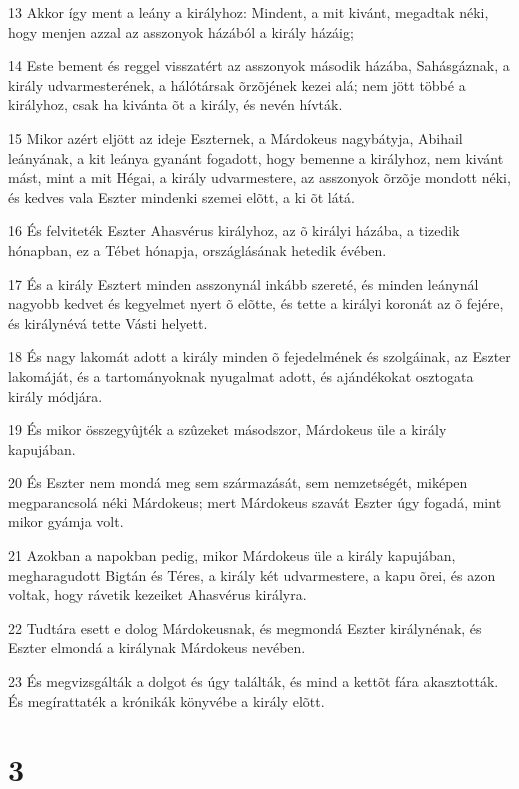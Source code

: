 \par 13 Akkor így ment a leány a királyhoz: Mindent, a mit kivánt, megadtak néki, hogy menjen azzal az asszonyok házából a király házáig;
\par 14 Este bement és reggel visszatért az asszonyok második házába, Sahásgáznak, a király udvarmesterének, a hálótársak õrzõjének kezei alá; nem jött többé a királyhoz, csak ha kivánta õt a király, és nevén hívták.
\par 15 Mikor azért eljött az ideje Eszternek, a Márdokeus nagybátyja, Abihail leányának, a kit leánya gyanánt fogadott, hogy bemenne a királyhoz, nem kivánt mást, mint a mit Hégai, a király udvarmestere, az asszonyok õrzõje mondott néki, és kedves vala Eszter mindenki szemei elõtt, a ki õt látá.
\par 16 És felviteték Eszter Ahasvérus királyhoz, az õ királyi házába, a tizedik hónapban, ez a Tébet hónapja, országlásának hetedik évében.
\par 17 És a király Esztert minden asszonynál inkább szereté, és minden leánynál nagyobb kedvet és kegyelmet nyert õ elõtte, és tette a királyi koronát az õ fejére, és királynévá tette Vásti helyett.
\par 18 És nagy lakomát adott a király minden õ fejedelmének és szolgáinak, az Eszter lakomáját, és a tartományoknak nyugalmat adott, és ajándékokat osztogata király módjára.
\par 19 És mikor összegyûjték a szûzeket másodszor, Márdokeus üle a király kapujában.
\par 20 És Eszter nem mondá meg sem származását, sem nemzetségét, miképen megparancsolá néki Márdokeus; mert Márdokeus szavát Eszter úgy fogadá, mint mikor gyámja volt.
\par 21 Azokban a napokban pedig, mikor Márdokeus üle a király kapujában, megharagudott Bigtán és Téres, a király két udvarmestere, a kapu õrei, és azon voltak, hogy rávetik kezeiket Ahasvérus királyra.
\par 22 Tudtára esett e dolog Márdokeusnak, és megmondá Eszter királynénak, és Eszter elmondá a királynak Márdokeus nevében.
\par 23 És megvizsgálták a dolgot és úgy találták, és mind a kettõt fára akasztották. És megírattaték a krónikák könyvébe a király elõtt.

\chapter{3}

